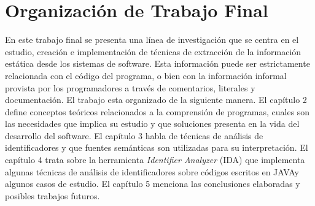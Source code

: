 \documentclass[12pt]{report}
\begin{document}
\section{Organización de Trabajo Final}
En este trabajo final se presenta una línea de investigación que se centra en el estudio, 
creación e implementación de técnicas de extracción de la información estática desde 
los sistemas de software. 
Esta información puede ser estrictamente relacionada con el código del programa, 
o bien con la información informal provista por los programadores a través de 
comentarios, literales y documentación. El trabajo esta organizado de la siguiente manera. El capítulo 2 define conceptos teóricos relacionados a la comprensión de programas, cuales son las necesidades que implica su estudio y que soluciones presenta en la vida del desarrollo del software. El capítulo 3 habla de técnicas de análisis de identificadores y que fuentes semánticas son utilizadas para su interpretación. El capítulo 4 trata sobre la herramienta \textit{Identifier Analyzer} (IDA) que implementa algunas técnicas de análisis de identificadores sobre códigos escritos en JAVA\texttrademark y algunos casos de estudio. El capítulo 5 menciona las conclusiones elaboradas y posibles trabajos futuros.


\end{document}
